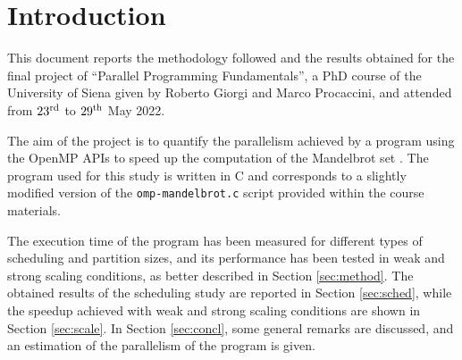 \section{Introduction}\label{sec:intro}
This document reports the methodology followed and the results obtained for the final project of ``Parallel Programming Fundamentals'', a PhD course of the University of Siena given by Roberto Giorgi and Marco Procaccini, and attended from $23^{\rm{rd}}$ to $29^{\rm{th}}$ May 2022.

The aim of the project is to quantify the parallelism achieved by a program using the OpenMP APIs \cite{openmp} to speed up the computation of the Mandelbrot set \cite{mandelbrot}. The program used for this study is written in C and corresponds to a slightly modified version of the \texttt{omp-mandelbrot.c} script provided within the course materials. 

The execution time of the program has been measured for different types of scheduling and partition sizes, and its performance has been tested in weak and strong scaling conditions, as better described in Section \ref{sec:method}. The obtained results of the scheduling study are reported in Section \ref{sec:sched}, while the speedup achieved with weak and strong scaling conditions are shown in Section \ref{sec:scale}. In Section \ref{sec:concl}, some general remarks are discussed, and an estimation of the parallelism of the program is given.